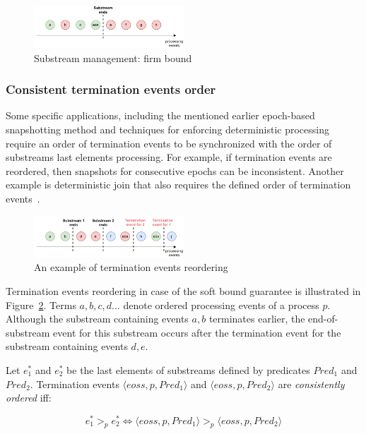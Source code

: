 \begin{figure}[t]
  \centering
  \includegraphics[width=0.50\textwidth]{pics/strict-guarantee.pdf}
  \caption{Substream management: firm bound}
  \label{strict_guarantees}
\end{figure}

\subsubsection{Consistent termination events order}
Some specific applications, including the mentioned earlier epoch-based snapshotting method and techniques for enforcing deterministic processing~\cite{we2018adbis} require an order of termination events to be synchronized with the order of substreams last elements processing. For example, if termination events are reordered, then snapshots for consecutive epochs can be inconsistent. Another example is deterministic join that also requires the defined order of termination events~\cite{gulisano2016scalejoin}.

\begin{figure}[htbp]
  \centering
  \includegraphics[width=0.50\textwidth]{pics/notifications-reordering.pdf}
  \caption{An example of termination events reordering}
  \label{notifications_reordering}
\end{figure}

Termination events reordering in case of the soft bound guarantee is illustrated in Figure~\ref{notifications_reordering}. Terms $a,b,c,d...$ denote ordered processing events of a process $p$. Although the substream containing events $a,b$ terminates earlier, the end-of-substream event for this substream occurs after the termination event for the substream containing events $d,e$. 

\begin{definition}
Let $e^{*}_1$ and $e^{*}_2$ be the last elements of substreams defined by predicates $Pred_1$ and $Pred_2$. Termination events $\langle eoss, p, Pred_1\rangle$ and $\langle eoss, p, Pred_2\rangle$ are {\em consistently ordered} iff:

\begin{equation}
e^{*}_1 >_p e^{*}_2 \Leftrightarrow \langle eoss, p, Pred_1\rangle >_p \langle eoss, p, Pred_2\rangle
\end{equation}
\end{definition}

